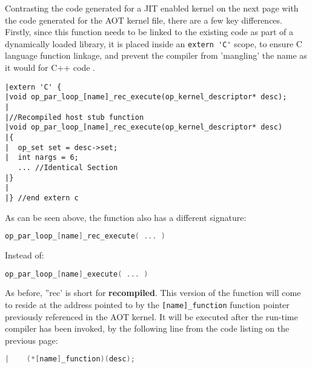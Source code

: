  Contrasting the code generated for a JIT enabled kernel on the next page with the code generated for the AOT kernel file, there are a few key differences. Firstly, since this function needs to be linked to the existing code as part of a dynamically loaded library, it is placed inside an \verb|extern 'C'| scope, to ensure C language function linkage, and prevent the compiler from 'mangling' the name as it would for C++ code \cite{linkage}.

\begin{lstlisting}[linewidth = \textwidth, framesep=0pt, linebackgroundcolor={\ifnum\value{lstnumber}<11 \ifnum\value{lstnumber}>6 \color{red!20} \else \color{green!20} \fi \else \color{green!20} \fi}]
|extern 'C' {
|void op_par_loop_[name]_rec_execute(op_kernel_descriptor* desc);
|
|//Recompiled host stub function
|void op_par_loop_[name]_rec_execute(op_kernel_descriptor* desc)
|{
|  op_set set = desc->set;
|  int nargs = 6;
   ... //Identical Section
|}
|
|} //end extern c
\end{lstlisting}


\noindent As can be seen above, the function also has a different signature:\vspace{1em}
\begin{lstlisting}[backgroundcolor=\color{green!20}, language=C]
op_par_loop_[name]_rec_execute( ... )
\end{lstlisting}
\vspace{-1em}
Instead of:
\vspace{.5em}
\begin{lstlisting}[backgroundcolor=\color{blue!20}, language=C]
op_par_loop_[name]_execute( ... )
\end{lstlisting}
As before, ''rec' is short for \textbf{recompiled}. This version of the function will come to reside at the address pointed to by the \verb|[name]_function| function pointer previously referenced in the AOT kernel. It will be executed after the run-time compiler has been invoked, by the following line from the code listing on the previous page:

\begin{lstlisting}[backgroundcolor=\color{blue!20}, language=C]
|    (*[name]_function)(desc);
\end{lstlisting}

